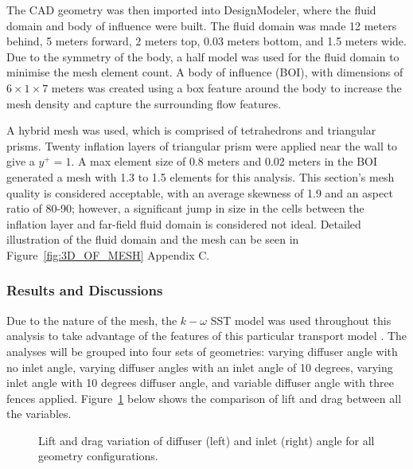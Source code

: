 \noindent The CAD geometry was then imported into DesignModeler, where the fluid domain and body of influence were built. The fluid domain was made 12 meters behind, 5 meters forward, 2 meters top, 0.03 meters bottom, and 1.5 meters wide. Due to the symmetry of the body, a half model was used for the fluid domain to minimise the mesh element count. A body of influence (BOI), with dimensions of  $6 \times 1 \times 7$ meters was created using a box feature around the body to increase the mesh density and capture the surrounding flow features.  

\noindent A hybrid mesh was used, which is comprised of tetrahedrons and triangular prisms. Twenty inflation layers of triangular prism were applied near the wall to give a $y^+=1$. A max element size of 0.8 meters and 0.02 meters in the BOI generated a mesh with 1.3 to 1.5 elements for this analysis. This section's mesh quality is considered acceptable, with an average skewness of 1.9 and an aspect ratio of 80-90; however, a significant jump in size in the cells between the inflation layer and far-field fluid domain is considered not ideal. Detailed illustration of the fluid domain and the mesh can be seen in Figure~\ref{fig:3D_OF_MESH} Appendix C.

\subsubsection{Results and Discussions}
Due to the nature of the mesh, the $k-\omega$ SST model was used throughout this analysis to take advantage of the features of this particular transport model \cite{Ansys2006ModelingFlows}. The analyses will be grouped into four sets of geometries: varying diffuser angle with no inlet angle, varying diffuser angles with an inlet angle of 10 degrees, varying inlet angle with 10 degrees diffuser angle, and variable diffuser angle with three fences applied. Figure~\ref{fig:3D_OF_PLOT_COMPARE_ALL} below shows the comparison of lift and drag between all the variables.

\begin{figure}[htb!]
    \centering
    \noindent{}
    \caption{Lift and drag variation of diffuser (left) and inlet (right) angle for all geometry configurations.}
    \label{fig:3D_OF_PLOT_COMPARE_ALL}
\end{figure}

